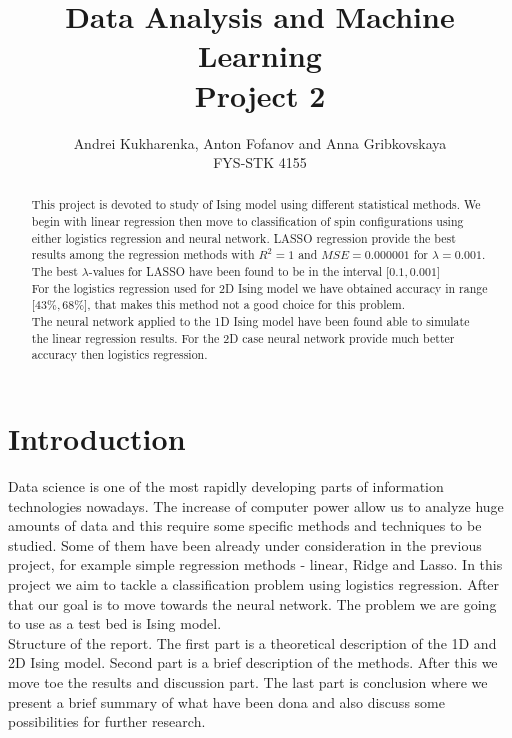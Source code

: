 \documentclass[10pt]{article}
\begin{document}
\setlength\parindent{1pt}
\title{Data Analysis and Machine Learning \\
	Project 2\\ }
\author{Andrei Kukharenka, Anton Fofanov and Anna Gribkovskaya \\  
	FYS-STK 4155 
}
\date{}

\maketitle

\begin{abstract}
	This project is devoted to study of Ising model using different statistical methods. We begin with linear regression then move to classification of spin configurations using either logistics regression and neural network. LASSO regression provide the best results among the regression methods with $R^2=1$ and $MSE=\num{0.000001}$ for $\lambda=\num{0.001}$. The best $\lambda$-values for LASSO have been found to be in the interval $\lbrack \num{0.1} , \num{0.001} \rbrack$\\
	For the logistics regression used for 2D Ising model we have obtained accuracy in range $\lbrack 43\% , 68\% \rbrack$,  that makes this method not a good choice for this problem.\\
	The neural network applied to the 1D Ising model have been found able to simulate the linear regression results. For the 2D case neural network provide much better accuracy then logistics regression. 

\end{abstract}
\newpage
\tableofcontents
\section{Introduction}

Data science is one of the most rapidly developing parts of information technologies nowadays. The increase of computer power allow us to analyze huge amounts of data and this require some specific methods and techniques to be studied. Some of them have been already under consideration in the previous project, for example simple regression methods - linear, Ridge and Lasso. In this project we aim to tackle a classification problem using logistics regression. After that our goal is to move towards the neural network. The problem we are going to use as a test bed is Ising model. \\

Structure of the report. The first part is a theoretical description of the 1D and 2D Ising model. Second part is a brief description of the methods. After this we move toe the results and discussion part. The last part is conclusion where we present a brief summary of what have been dona and also discuss some possibilities for further research.
\end{document}
